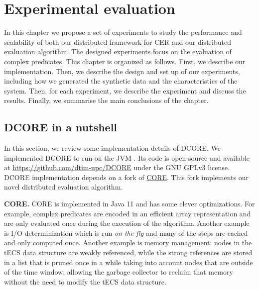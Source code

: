 \chapter{Experimental evaluation}\label{chapter:experimental_evaluation}

In this chapter we propose a set of experiments to study the performance and scalability of both our distributed framework for CER and our distributed evaluation algorithm. The designed experiments focus on the evaluation of complex predicates. This chapter is organized as follows. First, we describe our implementation. Then, we describe the design and set up of our experiments, including how we generated the synthetic data and the characteristics of the system. Then, for each experiment, we describe the experiment and discuss the results. Finally, we summarise the main conclusions of the chapter.

\section{DCORE in a nutshell}\label{chapter:dcore}

In this section, we review some implementation details of DCORE. We implemented DCORE to run on the JVM \cite{jvm}. Its code is open-source and available at \url{https://github.com/dtim-upc/DCORE} under the GNU GPLv3 license. DCORE implementation depends on a fork of \href{https://github.com/dtim-upc/CORE2/tree/distributed_enumeration}{CORE}. This fork implements our novel distributed evaluation algorithm.

\textbf{CORE.} CORE is implemented in Java 11 and has some clever optimizations. For example, complex predicates are encoded in an efficient array representation and are only evaluated once during the execution of the algorithm. Another example is I/O-determinization which is run \emph{on the fly} and many of the steps are cached and only computed once. Another example is memory management: nodes in the tECS data structure are weakly referenced, while the strong references are stored in a list that is pruned once in a while taking into account nodes that are outside of the time window, allowing the garbage collector to reclaim that memory without the need to modify the tECS data structure.

